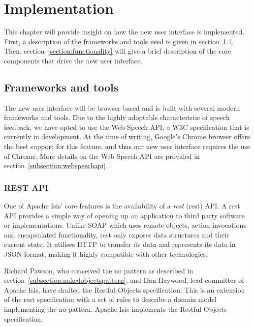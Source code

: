 \chapter{Implementation}
\label{chapter:implementation}
This chapter will provide insight on how the new user interface is implemented. First, a description of the frameworks and tools used is given in section~\ref{section:frameworkandtools}. Then, section~\ref{section:functionality} will give a brief description of the core components that drive the new user interface.

\section{Frameworks and tools}
\label{section:frameworkandtools}
The new user interface will be browser-based and is built with several modern frameworks and tools. Due to the highly adoptable characteristic of speech feedback, we have opted to use the Web Speech API, a W3C specification that is currently in development. At the time of writing, Google's Chrome browser offers the best support for this feature, and thus our new user interface requires the use of Chrome. More details on the Web Speech API are provided in section~\ref{subsection:webspeechapi}.

\subsection{REST API}
\label{subsection:restapi}
One of Apache Isis' core features is the availability of a \textit{\acrlong{rest}} (\acrshort{rest}) API. A \acrshort{rest} API provides a simple way of opening up an application to third party software or implementations. Unlike SOAP which uses remote objects, action invocations and encapsulated functionality, \acrshort{rest} only exposes data structures and their current state\cite{battle2008bridging}. It utilises HTTP to transfer its data and represents its data in JSON format, making it highly compatible with other technologies.

Richard Pawson, who conceived the \acrshort{no} pattern as described in section~\ref{subsection:nakedobjectspattern}, and Dan Haywood, lead committer of Apache Isis, have drafted the Restful Objects specification. This is an extension of the \acrshort{rest} specification with a set of rules to describe a domain model implementing the \acrshort{no} pattern\cite{Restf62:online}. Apache Isis implements the Restful Objects specification.

